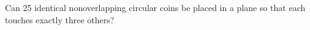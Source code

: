 Can 25 identical nonoverlapping circular coins be placed in a plane so that each touches exactly three others?
